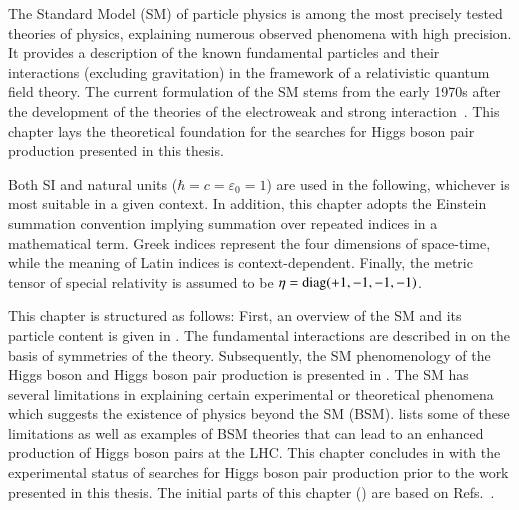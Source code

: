 The Standard Model (SM) of particle physics is among the most precisely tested
theories of physics, explaining numerous observed phenomena with high
precision. It provides a description of the known fundamental particles and
their interactions (excluding gravitation) in the framework of a relativistic
quantum field theory. The current formulation of the SM stems from the early
1970s after the development of the theories of the electroweak and strong
interaction~\cite{Glashow:1961tr,Salam:1964ry,Weinberg:1967tq,Englert:1964et,Higgs:1964pj,tHooft:1971qjg,Fritzsch:1973pi,Gross:1973id,Politzer:1973fx}.
This chapter lays the theoretical foundation for the searches for Higgs boson
pair production presented in this thesis.

Both SI and natural units ($\hbar = c = \varepsilon_0 = 1$) are used in the
following, whichever is most suitable in a given context. In addition, this
chapter adopts the Einstein summation convention implying summation over
repeated indices in a mathematical term. Greek indices represent the four
dimensions of space-time, while the meaning of Latin indices is
context-dependent. Finally, the metric tensor of special relativity is assumed
to be $\eta = \operatorname{diag}(+1, -1, -1, -1)$.

This chapter is structured as follows: First, an overview of the SM and its
particle content is given in . The fundamental
interactions are described in  on the
basis of symmetries of the theory. Subsequently, the SM phenomenology of the
Higgs boson and Higgs boson pair production is presented in
. The SM has several limitations in explaining certain
experimental or theoretical phenomena which suggests the existence of physics
beyond the SM (BSM).  lists some of these limitations as well as
examples of BSM theories that can lead to an enhanced production of Higgs boson
pairs at the LHC. This chapter concludes in  with
the experimental status of searches for Higgs boson pair production prior to the
work presented in this thesis. The initial parts of this chapter
() are based on
Refs.~\cite{Halzen:1984mc,Thomson:2013zua,Djouadi:2005gi}.

